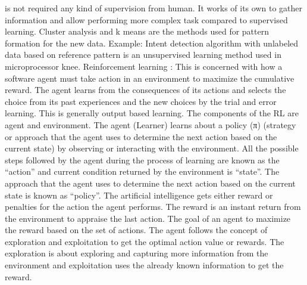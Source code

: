 \documentclass{article}
\begin{document}
is not required any kind of supervision from human. It works of its own to gather 
information and allow performing more complex task compared to supervised learning. 
Cluster analysis and k means are the methods used for pattern formation for the new data.
Example: Intent detection algorithm with unlabeled data based on reference pattern is an 
unsupervised learning method used in microprocessor knee.
Reinforcement learning :
This is concerned with how a software agent must take action in an environment to 
maximize the cumulative reward. The agent learns from the consequences of its actions and 
selects the choice from its past experiences and the new choices by the trial and error 
learning. This is generally output based learning. The components of the RL are agent and 
environment. The agent (Learner) learns about a policy (π) (strategy or approach that the 
agent uses to determine the next action based on the current state) by observing or 
interacting with the environment. All the possible steps followed by the agent during the 
process of learning are known as the “action” and current condition returned by the 
environment is “state”. The approach that the agent uses to determine the next action 
based on the current state is known as “policy”. The artificial intelligence gets either reward 
or penalties for the action the agent performs. The reward is an instant return from the 
environment to appraise the last action. The goal of an agent to maximize the reward based 
on the set of actions. The agent follows the concept of exploration and exploitation to get 
the optimal action value or rewards. The exploration is about exploring and capturing more 
information from the environment and exploitation uses the already known information to 
get the reward.
\end{document}
